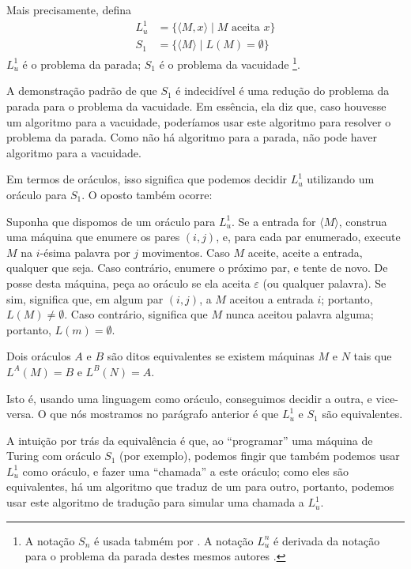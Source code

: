 Mais precisamente, defina
\begin{align*}
    L_u^1 &= \{ \langle M, x \rangle \mid M \text{ aceita } x \} \\
    S_1 &= \{ \langle M \rangle \mid L(M) = \emptyset \}
\end{align*}
$L_u^1$ é o problema da parada; $S_1$ é o problema da vacuidade%
\footnote{
    A notação $S_n$ é usada tabmém por .
    A notação $L_u^n$ é derivada da notação para o problema da parada
    destes mesmos autores \cite[p. 183]{HopcroftUllman1979}.
}.

A demonstração padrão de que $S_1$ é indecidível
é uma redução do problema da parada para o problema da vacuidade.
Em essência, ela diz que,
caso houvesse um algoritmo para a vacuidade,
poderíamos usar este algoritmo para resolver o problema da parada.
Como não há algoritmo para a parada,
não pode haver algoritmo para a vacuidade.

Em termos de oráculos,
isso significa que podemos decidir $L_u^1$
utilizando um oráculo para $S_1$.
O oposto também ocorre:

Suponha que dispomos de um oráculo para $L_u^1$.
Se a entrada for $\langle M \rangle$,
construa uma máquina que enumere os pares $(i, j)$,
e, para cada par enumerado,
execute $M$ na $i$-ésima palavra por $j$ movimentos.
Caso $M$ aceite, aceite a entrada, qualquer que seja.
Caso contrário, enumere o próximo par, e tente de novo.
De posse desta máquina, peça ao oráculo se ela aceita $\varepsilon$
(ou qualquer palavra).
Se sim, significa que, em algum par $(i, j)$,
a $M$ aceitou a entrada $i$; portanto, $L(M) \neq \emptyset$.
Caso contrário, significa que $M$ nunca aceitou palavra alguma;
portanto, $L(m) = \emptyset$.

\begin{definition}
    Dois oráculos $A$ e $B$ são ditos equivalentes
    se existem máquinas $M$ e $N$ tais que
    $L^A(M) = B$ e $L^B(N) = A$.
\end{definition}

Isto é, usando uma linguagem como oráculo, conseguimos decidir a outra,
e vice-versa.
O que nós mostramos no parágrafo anterior é que
$L_u^1$ e $S_1$ são equivalentes.

A intuição por trás da equivalência é que,
ao ``programar'' uma máquina de Turing com oráculo $S_1$ (por exemplo),
podemos fingir que também podemos usar $L_u^1$ como oráculo,
e fazer uma ``chamada'' a este oráculo;
como eles são equivalentes,
há um algoritmo que traduz de um para outro,
portanto, podemos usar este algoritmo de tradução
para simular uma chamada a $L_u^1$.

